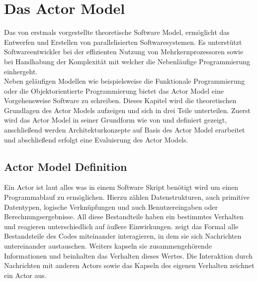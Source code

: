 \chapter{Das Actor Model}
Das von \cite{hewitt1973session} erstmals vorgestellte theoretische Software Model, ermöglicht das Entwerfen und Erstellen von parallelisierten Softwaresystemen. Es unterstützt Softwareentwickler bei der effizienten Nutzung von Mehrkernprozessoren sowie bei Handhabung der  Komplexität mit welcher die Nebenläufige Programmierung einhergeht.   
\\
Neben geläufigen Modellen wie beispielsweise die Funktionale Programmierung oder die Objektorientierte Programmierung bietet das Actor Model eine Vorgehensweise Software zu schreiben. Dieses Kapitel wird die theoretischen Grundlagen des Actor Models aufzeigen und sich in drei Teile unterteilen. Zuerst wird das Actor Model in seiner Grundform wie von \cite{hewitt1973session} und \cite{Agha1985ActorsSystems} definiert gezeigt, anschließend werden Architekturkonzepte auf Basis des Actor Model erarbeitet und abschließend erfolgt eine Evaluierung des Actor Models.

\section{Actor Model Definition}
Ein Actor ist laut \cite{hewitt1973session} alles was in einem Software Skript benötigt wird um einen Programmablauf zu ermöglichen. Hierzu zählen Datenstrukturen, auch primitive Datentypen, logische Verknüpfungen und auch Benutzereingaben oder Berechnungsergebnisse.
All diese Bestandteile haben ein bestimmtes Verhalten und reagieren unterschiedlich auf äußere Einwirkungen.
\cite{hewitt1973session} zeigt das Formal alle Bestandsteile des Codes miteinander interagieren, in dem sie sich Nachrichten untereinander austauschen.  Weiters kapseln sie zusammengehörende Informationen und beinhalten das Verhalten dieses Wertes. Die Interaktion durch Nachrichten mit anderen Actors sowie das Kapseln des eigenen Verhalten zeichnet ein Actor aus.

